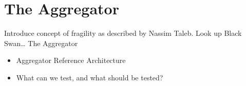 \chapter{The Aggregator} %
\label{cha:aggregator}
Introduce concept of fragility as described by Nassim Taleb. Look up Black Swan\ldots
The Aggregator
\begin{itemize}
	\item Aggregator Reference Architecture
	\item What can we test, and what should be tested?
\end{itemize}
